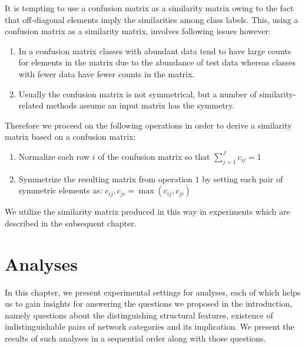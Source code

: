 \documentclass[..]{revtex4}
\begin{document}
It is tempting to use a confusion matrix as a similarity matrix owing to the fact that off-diagonal elements imply the similarities among class labels. This, using a confusion matrix as a similarity matrix, involves following issues however:
\begin{enumerate}
	\item In a confusion matrix classes with abundant data tend to have large counts for elements in the matrix due to the abundance of test data whereas classes with fewer data have fewer counts in the matrix.
	\item Usually the confusion matrix is not symmetrical, but a number of similarity-related methods assume an input matrix has the symmetry.
\end{enumerate}

Therefore we proceed on the following operations in order to derive a similarity matrix based on a confusion matrix:
\begin{enumerate}
	\item Normalize each row $i$ of the confusion matrix so that $\sum_{j=1}^J c_{ij} = 1$
	\item Symmetrize the resulting matrix from operation $1$ by setting each pair of symmetric elements as: $c_{ij},c_{ji} = \max (c_{ij},c_{ji})$
\end{enumerate}

We utilize the similarity matrix produced in this way in experiments which are described in the subsequent chapter.

\newpage	
\section{Analyses}
In this chapter, we present experimental settings for analyses, each of which helps us to gain insights for answering the questions we proposed in the introduction, namely questions about the distinguishing structural features, existence of indistinguishable pairs of network categories and its implication. We present the results of such analyses in a sequential order along with those questions. 
\end{document}
